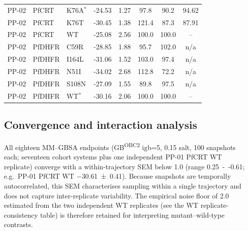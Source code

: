 \documentclass[journal=jcisd8,manuscript=suppinfo,layout=traditional]{achemso}
\begin{document}
\begin{table}[htbp]
\begin{tabularx}{\textwidth}{l l l S[table-format=-2.2] S[table-format=1.2] S[table-format=3.1] S[table-format=3.1] S[table-format=3.2]}
PP-02 & PfCRT & K76A$^\ast$ & -24.53 & 1.27 & 97.8 & 90.2 & 94.62 \\
PP-02 & PfCRT & K76T & -30.45 & 1.38 & 121.4 & 87.3 & 87.91 \\
PP-02 & PfCRT & WT & -25.08 & 2.56 & 100.0 & 100.0 & {--} \\
PP-02 & PfDHFR & C59R & -28.85 & 1.88 & 95.7 & 102.0 & n/a \\
PP-02 & PfDHFR & I164L & -31.06 & 1.52 & 103.0 & 97.4 & n/a \\
PP-02 & PfDHFR & N51I & -34.02 & 2.68 & 112.8 & 72.2 & n/a \\
PP-02 & PfDHFR & S108N & -27.09 & 1.55 & 89.8 & 97.5 & n/a \\
PP-02 & PfDHFR & WT$^\ast$ & -30.16 & 2.06 & 100.0 & 100.0 & {--} \\
\bottomrule
\end{tabularx}
\setlength{\tabcolsep}{6pt}
\end{table}



\subsection*{Convergence and interaction analysis}
All eighteen MM--GBSA endpoints (GB\textsuperscript{OBC2} igb=5, \qty{0.15}{\molar} salt, \num{100} snapshots each; seventeen cohort systems plus one independent PP-01 PfCRT WT replicate) converge with a within-trajectory SEM below \qty{1.0}{\kcalmol} (range \qty{0.25}{--}\qty{0.61}{\kcalmol}; e.g.\ PP-01 PfCRT WT \qty{-30.61\pm0.41}{\kcalmol}). Because snapshots are temporally autocorrelated, this SEM characterises sampling within a single trajectory and does not capture inter-replicate variability. The empirical noise floor of \qty{2.0}{\kcalmol} estimated from the two independent WT replicates (see the WT replicate-consistency table) is therefore retained for interpreting mutant--wild-type contrasts.
\end{document}
